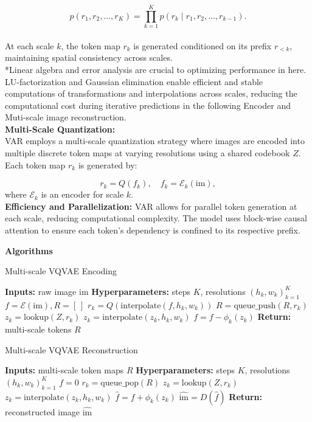 \documentclass[12pt]{article}
\begin{document}
\[
p(r_1, r_2, \ldots, r_K) = \prod_{k=1}^K p(r_k \mid r_1, r_2, \ldots, r_{k-1}).
\]
\\
At each scale \( k \), the token map \( r_k \) is generated conditioned on its prefix \( r_{<k} \), maintaining spatial consistency across scales.
\\
*Linear algebra and error analysis are crucial to optimizing performance in here. LU-factorization and Gaussian elimination enable efficient and stable computations of transformations and interpolations across scales, reducing the computational cost during iterative predictions in the following Encoder and Muti-scale image reconstruction.
\\
\textbf{Multi-Scale Quantization:}
\\
VAR employs a multi-scale quantization strategy where images are encoded into multiple discrete token maps at varying resolutions using a shared codebook \( Z \). Each token map \( r_k \) is generated by:

\[
r_k = Q(f_k), \quad f_k = \mathcal{E}_k(\text{im}),
\]
where \( \mathcal{E}_k \) is an encoder for scale \( k \).
\\
\textbf{Efficiency and Parallelization:}
VAR allows for parallel token generation at each scale, reducing computational complexity. The model uses block-wise causal attention to ensure each token's dependency is confined to its respective prefix.

\newpage

\textbf{Algorithms}
\\
\begin{algorithm}
\caption{Multi-scale VQVAE Encoding}
\begin{algorithmic}[1]
\State \textbf{Inputs:} raw image $\text{im}$
\State \textbf{Hyperparameters:} steps $K$, resolutions $(h_k, w_k)_{k=1}^K$
\State $f = \mathcal{E}(\text{im}), R = [\ ]$
    \State $r_k = Q(\text{interpolate}(f, h_k, w_k))$
    \State $R = \text{queue\_push}(R, r_k)$
    \State $z_k = \text{lookup}(Z, r_k)$
    \State $z_k = \text{interpolate}(z_k, h_k, w_k)$
    \State $f = f - \phi_k(z_k)$
\EndFor
\State \textbf{Return:} multi-scale tokens $R$
\end{algorithmic}
\end{algorithm}

\begin{algorithm}
\caption{Multi-scale VQVAE Reconstruction}
\begin{algorithmic}[1]
\State \textbf{Inputs:} multi-scale token maps $R$
\State \textbf{Hyperparameters:} steps $K$, resolutions $(h_k, w_k)_{k=1}^K$
\State $f = 0$
    \State $r_k = \text{queue\_pop}(R)$
    \State $z_k = \text{lookup}(Z, r_k)$
    \State $z_k = \text{interpolate}(z_k, h_k, w_k)$
    \State $\hat{f} = f + \phi_k(z_k)$
    \State $\hat{\text{im}} = D(\hat{f})$
\EndFor
\State \textbf{Return:} reconstructed image $\hat{\text{im}}$
\end{algorithmic}
\end{algorithm}
\end{document}
